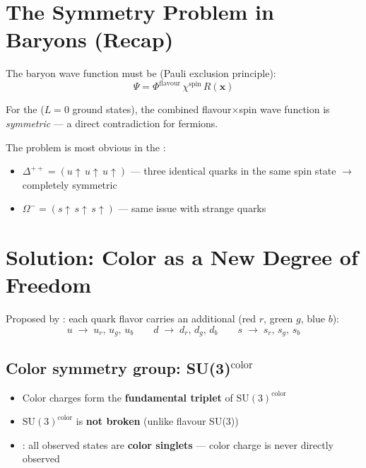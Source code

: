 \section{The Symmetry Problem in Baryons (Recap)}

The baryon wave function must be  (Pauli exclusion principle):
\[
  \Psi = \Phi^{\mathrm{flavour}}\, \chi^{\mathrm{spin}}\, R(\mathbf{x})
\]

For the  ($L=0$ ground states), the combined flavour$\times$spin wave function
is \emph{symmetric} --- a direct contradiction for fermions.

The problem is most obvious in the :
\begin{itemize}
  \item $\Delta^{++} = (u{\uparrow}\, u{\uparrow}\, u{\uparrow})$ --- three identical quarks in the
        same spin state $\to$ completely symmetric
  \item $\Omega^{-} = (s{\uparrow}\, s{\uparrow}\, s{\uparrow})$ --- same issue with strange quarks
\end{itemize}


\section{Solution: Color as a New Degree of Freedom}

Proposed by : each quark flavor carries an additional
 (red $r$, green $g$, blue $b$):
\[
  u \;\to\; u_r,\, u_g,\, u_b \qquad
  d \;\to\; d_r,\, d_g,\, d_b \qquad
  s \;\to\; s_r,\, s_g,\, s_b
\]

\subsection{Color symmetry group: SU(3)$^{\mathrm{color}}$}

\begin{itemize}
  \item Color charges form the \textbf{fundamental triplet} of $\mathrm{SU}(3)^{\mathrm{color}}$
  \item $\mathrm{SU}(3)^{\mathrm{color}}$ is \textbf{not broken} (unlike flavour SU(3))
  \item {}: all observed states are \textbf{color singlets}
        --- color charge is never directly observed
\end{itemize}


